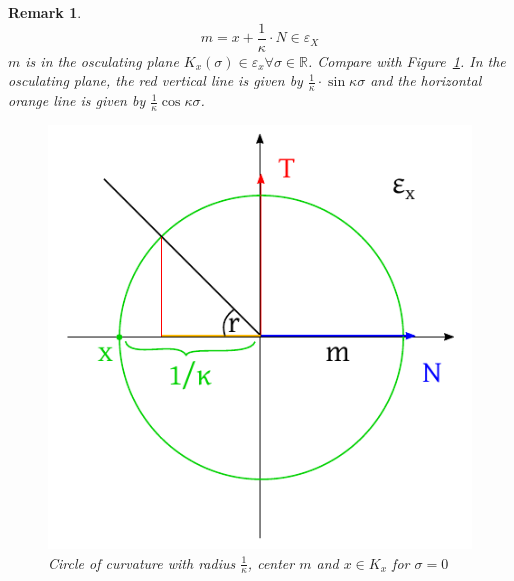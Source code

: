 \documentclass{article}
\newtheorem{remark}{Remark}  \numberwithin{remark}{section}
\begin{document}
\begin{remark}
  \[ m = x + \frac{1}{\kappa} \cdot N \in \varepsilon_X \]
  $m$ is in the osculating plane $K_x(\sigma) \in \varepsilon_x \forall \sigma \in \mathbb R$.
  Compare with Figure~\ref{img:ccurvature}.
  In the osculating plane, the red vertical line is given by $\frac{1}{\kappa} \cdot \sin{\kappa\sigma}$
  and the horizontal orange line is given by $\frac{1}{\kappa} \cos{\kappa\sigma}$.
  \begin{figure}[t]
    \begin{center}
      \includegraphics{img/52_curvature_circle.pdf}
      \caption{Circle of curvature with radius $\frac{1}{\kappa}$, center $m$ and $x \in K_x$ for $\sigma = 0$}
      \label{img:ccurvature}
    \end{center}
  \end{figure}
\end{remark}
\end{document}
